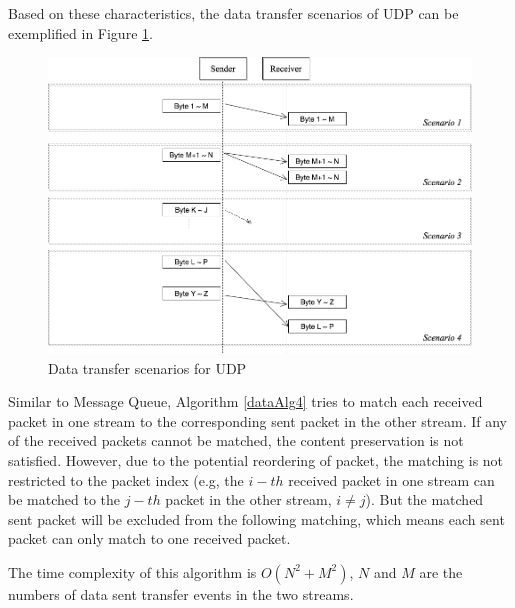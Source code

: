 \documentclass[12pt,oneside]{book}
\providecommand{\DIFdelbegin}{} %
\newcommand{\DIFscaledelfig}{0.5}
\newlength{\DIFdelgraphicswidth} %
\newlength{\DIFdelgraphicsheight} %
\newcommand{\DIFdelincludegraphics}[2][]{%
\sbox{\DIFdelgraphicsbox}{\DIFOincludegraphics[#1]{#2}}%
\settoboxwidth{\DIFdelgraphicswidth}{\DIFdelgraphicsbox} %
\settoboxtotalheight{\DIFdelgraphicsheight}{\DIFdelgraphicsbox} %
\scalebox{\DIFscaledelfig}{%
\parbox[b]{\DIFdelgraphicswidth}{\usebox{\DIFdelgraphicsbox}\\[-\baselineskip] \rule{\DIFdelgraphicswidth}{0em}}\llap{\resizebox{\DIFdelgraphicswidth}{\DIFdelgraphicsheight}{%
\setlength{\unitlength}{\DIFdelgraphicswidth}%
\begin{picture}(1,1)%
\thicklines\linethickness{2pt} %
{\color[rgb]{1,0,0}\put(0,0){\framebox(1,1){}}}%
{\color[rgb]{1,0,0}\put(0,0){\line( 1,1){1}}}%
{\color[rgb]{1,0,0}\put(0,1){\line(1,-1){1}}}%
\end{picture}%
}\hspace*{3pt}}} %
} %
\DeclareRobustCommand{\DIFdelbegin}{\DIFOdelbegin \let\includegraphics\DIFdelincludegraphics} %
\begin{document}
Based on these characteristics, the data transfer scenarios of UDP can be exemplified in Figure \ref{upd}.
\begin{figure}[H]
\centerline{\includegraphics[scale=0.4]{Figures/udp}}
 \caption{Data transfer scenarios for UDP}
\label{upd}
\end{figure}

Similar to Message Queue, Algorithm \ref{dataAlg4} tries to match each received packet in one stream to the corresponding sent packet in the other stream. If any of the received packets cannot be matched, the content preservation is not satisfied. However, due to the potential reordering of packet, the matching is not restricted to the packet index (e.g, the $i-th$ received packet in one stream can be matched to the $j-th$ packet in the other stream, $i \neq j$). But the matched sent packet will be excluded from the following matching, which means each sent packet can only match to one received packet.

The time complexity of this algorithm is $O(N^2+M^2)$, $N$ and $M$ are the numbers of data sent transfer events in the two streams.
\DIFdelbegin %
\end{document}
